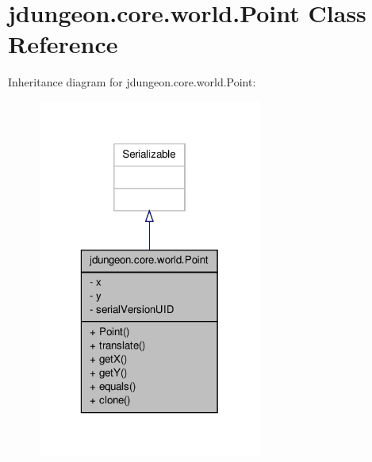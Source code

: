 \hypertarget{classjdungeon_1_1core_1_1world_1_1_point}{
\section{jdungeon.core.world.Point Class Reference}
\label{classjdungeon_1_1core_1_1world_1_1_point}
}


Inheritance diagram for jdungeon.core.world.Point:
\nopagebreak
\begin{figure}[H]
\begin{center}
\leavevmode
\includegraphics[width=208pt]{classjdungeon_1_1core_1_1world_1_1_point__inherit__graph}
\end{center}
\end{figure}


